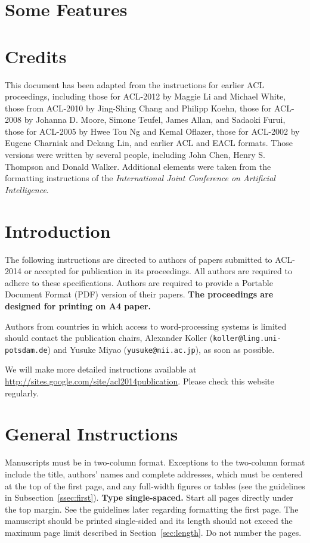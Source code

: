 \documentclass[11pt]{article}
\begin{document}
\section{Some Features}


\section{Credits}

This document has been adapted from the instructions for earlier ACL
proceedings, including those for ACL-2012 by Maggie Li and Michael
White, those from ACL-2010 by Jing-Shing Chang and Philipp Koehn,
those for ACL-2008 by Johanna D. Moore, Simone Teufel, James Allan,
and Sadaoki Furui, those for ACL-2005 by Hwee Tou Ng and Kemal
Oflazer, those for ACL-2002 by Eugene Charniak and Dekang Lin, and
earlier ACL and EACL formats. Those versions were written by several
people, including John Chen, Henry S. Thompson and Donald
Walker. Additional elements were taken from the formatting
instructions of the {\em International Joint Conference on Artificial
  Intelligence}.

\section{Introduction}

The following instructions are directed to authors of papers submitted
to ACL-2014 or accepted for publication in its proceedings. All
authors are required to adhere to these specifications. Authors are
required to provide a Portable Document Format (PDF) version of their
papers. \textbf{The proceedings are designed for printing on A4
  paper.}

Authors from countries in which access to word-processing systems is
limited should contact the publication chairs, Alexander Koller
(\texttt{koller@ling.uni-potsdam.de}) and Yusuke Miyao
(\texttt{yusuke@nii.ac.jp}), as soon as possible.

We will make more detailed instructions available at
\url{http://sites.google.com/site/acl2014publication}. Please check
this website regularly.


\section{General Instructions}

Manuscripts must be in two-column format.  Exceptions to the
two-column format include the title, authors' names and complete
addresses, which must be centered at the top of the first page, and
any full-width figures or tables (see the guidelines in
Subsection~\ref{ssec:first}). {\bf Type single-spaced.}  Start all
pages directly under the top margin. See the guidelines later
regarding formatting the first page.  The manuscript should be
printed single-sided and its length
should not exceed the maximum page limit described in Section~\ref{sec:length}.
Do not number the pages.
\end{document}
